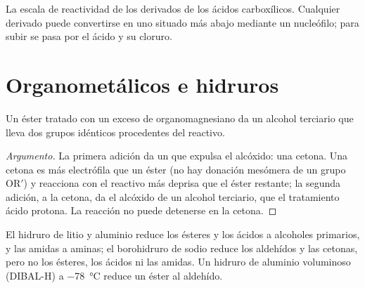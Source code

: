 \begin{omfigure}

{\small La escala de reactividad de los derivados de los ácidos carboxílicos. Cualquier derivado puede convertirse en
uno situado más abajo mediante un nucleófilo; para subir se pasa por el ácido y su cloruro.}
\end{omfigure}

\section{Organometálicos e hidruros}

\begin{proposition}\label{prop:b2:acyl-substitution:grignard-ester}
Un éster tratado con un exceso de organomagnesiano da un alcohol terciario que lleva dos
grupos idénticos procedentes del reactivo.
\end{proposition}

\begin{proof}[Argumento]
La primera adición da un  que expulsa el alcóxido: una cetona. Una cetona
es más electrófila que un éster (no hay donación mesómera de un grupo $\mathrm{OR'}$) y reacciona con
el reactivo más deprisa que el éster restante; la segunda adición, a la cetona, da el alcóxido
de un alcohol terciario, que el tratamiento ácido protona. La reacción no puede detenerse en la cetona.
\end{proof}

\begin{proposition}\label{prop:b2:acyl-substitution:hydrides}
El hidruro de litio y aluminio reduce los ésteres y los ácidos a alcoholes primarios, y las amidas a aminas;
el borohidruro de sodio reduce los aldehídos y las cetonas, pero no los ésteres, los ácidos ni las amidas. Un hidruro de aluminio
voluminoso (DIBAL-H) a \qty{-78}{\degreeCelsius} reduce un éster al aldehído.
\end{proposition}

